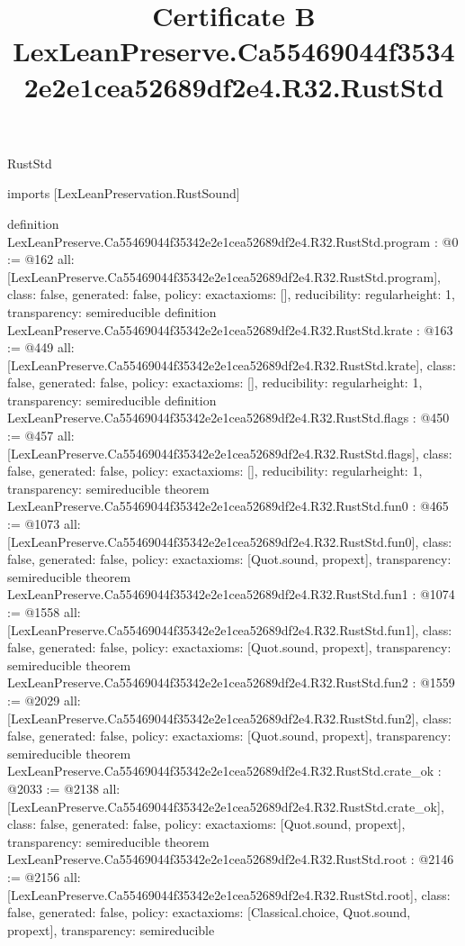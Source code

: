 \begin{lexlean}{RustStd}
\title{Certificate B LexLeanPreserve.Ca55469044f35342e2e1cea52689df2e4.R32.RustStd}
\begin{coremodule}
imports [LexLeanPreservation.RustSound]

definition LexLeanPreserve.Ca55469044f35342e2e1cea52689df2e4.R32.RustStd.program : @0 := @162 {
  all: [LexLeanPreserve.Ca55469044f35342e2e1cea52689df2e4.R32.RustStd.program],
  class: false,
  generated: false,
  policy: exact{axioms: []},
  reducibility: regular{height: 1},
  transparency: semireducible
}
definition LexLeanPreserve.Ca55469044f35342e2e1cea52689df2e4.R32.RustStd.krate : @163 := @449 {
  all: [LexLeanPreserve.Ca55469044f35342e2e1cea52689df2e4.R32.RustStd.krate],
  class: false,
  generated: false,
  policy: exact{axioms: []},
  reducibility: regular{height: 1},
  transparency: semireducible
}
definition LexLeanPreserve.Ca55469044f35342e2e1cea52689df2e4.R32.RustStd.flags : @450 := @457 {
  all: [LexLeanPreserve.Ca55469044f35342e2e1cea52689df2e4.R32.RustStd.flags],
  class: false,
  generated: false,
  policy: exact{axioms: []},
  reducibility: regular{height: 1},
  transparency: semireducible
}
theorem LexLeanPreserve.Ca55469044f35342e2e1cea52689df2e4.R32.RustStd.fun0 : @465 := @1073 {
  all: [LexLeanPreserve.Ca55469044f35342e2e1cea52689df2e4.R32.RustStd.fun0],
  class: false,
  generated: false,
  policy: exact{axioms: [Quot.sound, propext]},
  transparency: semireducible
}
theorem LexLeanPreserve.Ca55469044f35342e2e1cea52689df2e4.R32.RustStd.fun1 : @1074 := @1558 {
  all: [LexLeanPreserve.Ca55469044f35342e2e1cea52689df2e4.R32.RustStd.fun1],
  class: false,
  generated: false,
  policy: exact{axioms: [Quot.sound, propext]},
  transparency: semireducible
}
theorem LexLeanPreserve.Ca55469044f35342e2e1cea52689df2e4.R32.RustStd.fun2 : @1559 := @2029 {
  all: [LexLeanPreserve.Ca55469044f35342e2e1cea52689df2e4.R32.RustStd.fun2],
  class: false,
  generated: false,
  policy: exact{axioms: [Quot.sound, propext]},
  transparency: semireducible
}
theorem LexLeanPreserve.Ca55469044f35342e2e1cea52689df2e4.R32.RustStd.crate_ok : @2033 := @2138 {
  all: [LexLeanPreserve.Ca55469044f35342e2e1cea52689df2e4.R32.RustStd.crate_ok],
  class: false,
  generated: false,
  policy: exact{axioms: [Quot.sound, propext]},
  transparency: semireducible
}
theorem LexLeanPreserve.Ca55469044f35342e2e1cea52689df2e4.R32.RustStd.root : @2146 := @2156 {
  all: [LexLeanPreserve.Ca55469044f35342e2e1cea52689df2e4.R32.RustStd.root],
  class: false,
  generated: false,
  policy: exact{axioms: [Classical.choice, Quot.sound, propext]},
  transparency: semireducible
}


\end{coremodule}
\end{lexlean}
